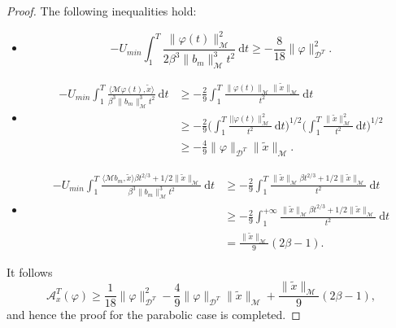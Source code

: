 \documentclass[a4paper,10pt]{amsart}
\newcommand{\ud}{\mathrm{d}}
\theoremstyle{plain}
\theoremstyle{definition}
\numberwithin{equation}{section}
\numberwithin{thm}{section}
\begin{document}
\begin{proof}
The following inequalities hold:
\begin{itemize}
    \item \[-U_{min}\int_1^T\frac{\|\varphi(t)\|_\mathcal{M}^2}{2\beta^3\|b_m\|_\mathcal{M}^3t^2}\ \ud t \ge -\frac{8}{18}\|\varphi\|_{\mathcal{D}^T}^2.
    \]
    \item \[\begin{split}-U_{min}\int_1^T\frac{\langle \mathcal{M}\varphi(t),\tilde x\rangle}{\beta^3\|b_m\|_\mathcal{M}^3t^2}\ \ud t&\ge-\frac{2}{9}\int_{1}^{T} \frac{\|\varphi(t)\|_\mathcal{M}\|\tilde x\|_\mathcal{M}}{t^2}\ \ud t\\
    &\ge -\frac{2}{9}\bigg(\int_{1}^{T}\frac{||\varphi(t)\|_\mathcal{M}^2}{t^2}\ \ud t\bigg)^{1/2}\bigg(\int_{1}^{T}\frac{\|\tilde x\|_\mathcal{M}^2}{t^2}\ \ud t\bigg)^{1/2}\\
    &\ge-\frac{4}{9}\|\varphi\|_{\mathcal{D}^T}\|\tilde x\|_\mathcal{M}. \end{split}\]
    \item \[
    \begin{split}
        -U_{min}\int_1^T \frac{\langle\mathcal{M} b_m,\tilde x\rangle \beta t^{2/3}+1/2\|\tilde x\|_\mathcal{M}}{\beta^3\|b_m\|_\mathcal{M}^3t^2}\ \ud t& \ge -\frac{2}{9}\int_{1}^{T}\frac{\|\tilde x\|_\mathcal{M}\beta t^{2/3} + 1/2\|\tilde x\|_\mathcal{M}}{t^2}\ \ud t\\
        & \ge -\frac{2}{9}\int_{1}^{+\infty}\frac{\|\tilde x\|_\mathcal{M}\beta t^{2/3} + 1/2\|\tilde x\|_\mathcal{M}}{t^2}\ \ud t\\
        &= \frac{\|\tilde x\|_\mathcal{M}}{9}(2\beta-1).
    \end{split}
    \]
\end{itemize}

It follows
\[
\mathcal{A}_{x}^T(\varphi) \geq \frac{1}{18}\|\varphi\|_{\mathcal{D}^T}^2 - \frac{4}{9}\|\varphi\|_{\mathcal{D}^T}\|\tilde x\|_\mathcal{M} + \frac{\|\tilde x\|_\mathcal{M}}{9}(2\beta-1),
\]
and hence the proof for the parabolic case is completed.


\end{proof}
\end{document}
